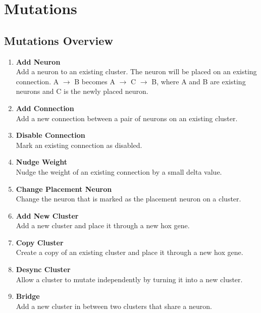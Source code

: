 \newpage
\section{Mutations}

\subsection{Mutations Overview}

\begin{enumerate}\itemsep0pt
	\item \textbf{Add Neuron} \\
	Add a neuron to an existing cluster. The neuron will be placed on an existing connection.  
	A $\rightarrow$ B becomes A $\rightarrow$ C $\rightarrow$ B, where A and B are existing neurons and C is the newly placed neuron.
	
	\item \textbf{Add Connection} \\
	Add a new connection between a pair of neurons on an existing cluster.
	
	\item \textbf{Disable Connection} \\	
	Mark an existing connection as disabled.
	
	\item \textbf{Nudge Weight} \\	
	Nudge the weight of an existing connection by a small delta value.
	
	\item \textbf{Change Placement Neuron} \\	
	Change the neuron that is marked as the placement neuron on a cluster.
	
	\item \textbf{Add New Cluster} \\	
	Add a new cluster and place it through a new hox gene.
	
	\item \textbf{Copy Cluster} \\	
	Create a copy of an existing cluster and place it through a new hox gene.
	
	\item \textbf{Desync Cluster} \\	
	Allow a cluster to mutate independently by turning it into a new cluster.
	
	\item \textbf{Bridge} \\	
	Add a new cluster in between two clusters that share a neuron.
	

\end{enumerate}
